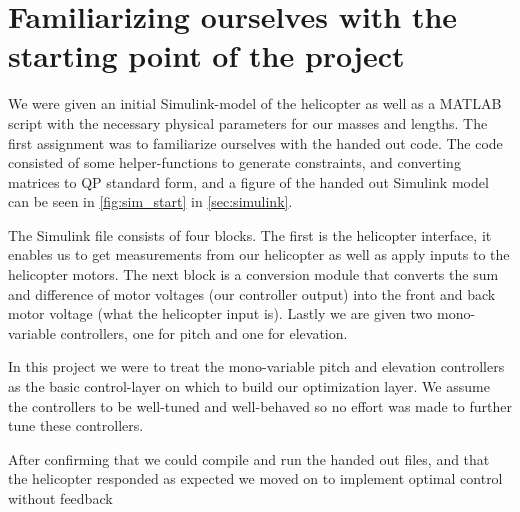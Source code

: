 \section{Familiarizing ourselves with the starting point of the project}\label{sec:ex1}

We were given an initial Simulink-model of the helicopter as well as a MATLAB script with the necessary physical parameters for our masses and lengths. The first assignment was to familiarize ourselves with the handed out code. The code consisted of some helper-functions to generate constraints, and converting matrices to QP standard form, and a figure of the handed out Simulink model can be seen in \cref{fig:sim_start} in \cref{sec:simulink}.

The Simulink file consists of four blocks. The first is the helicopter interface, it enables us to get measurements from our helicopter as well as apply inputs to the helicopter motors. The next block is a conversion module that converts the sum and difference of motor voltages (our controller output) into the front and back motor voltage (what the helicopter input is). Lastly we are given two mono-variable controllers, one for pitch and one for elevation.

In this project we were to treat the mono-variable pitch and elevation controllers as the basic control-layer on which to build our optimization layer. We assume the controllers to be well-tuned and well-behaved so no effort was made to further tune these controllers.

After confirming that we could compile and run the handed out files, and that the helicopter responded as expected we moved on to implement optimal control without feedback